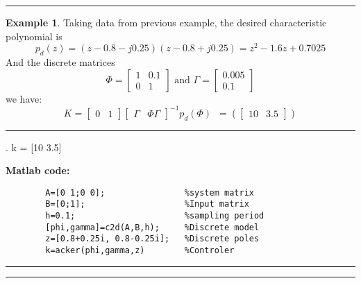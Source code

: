 \documentclass[nols]{tufte-handout}
\theoremstyle{definition}
\newtheorem{exmp}{Example}[section]
\begin{document}
\vspace{1cm}
\hrule height 1pt
\begin{exmp} 
    Taking data from previous example, the desired characteristic polynomial is
\[
p_{d}(z)=(z-0.8-j0.25)(z-0.8+j0.25)=z^{2}-1.6z+0.7025
\]
And the discrete matrices
\[
    \Phi=
    \begin{bmatrix} 
1 & 0.1\\
0 & 1
\end{bmatrix}
\text{ and }
\Gamma=
\begin{bmatrix}
0.005\\
0.1
\end{bmatrix}
\]
we have:
\[
K=
\begin{bmatrix}
0 & 1
\end{bmatrix}
\begin{bmatrix}
\Gamma & \Phi\Gamma
\end{bmatrix}^{-1}p_{d}\left( \Phi \right) \,\,\, = \left(
\begin{bmatrix}
10 & 3.5
\end{bmatrix}
\right)
\]

    \noindent\hfil\rule{\textwidth}{.4pt}\hfil
       \begin{verbbox}[\footnotesize]
                                                            .           
k =
[10  3.5]

    \end{verbbox} 
\textbf{Matlab code:}
    \begin{verbatim}
        A=[0 1;0 0];                %system matrix
        B=[0;1];                    %Input matrix
        h=0.1;                      %sampling period
        [phi,gamma]=c2d(A,B,h);     %Discrete model
        z=[0.8+0.25i, 0.8-0.25i];   %Discrete poles
        k=acker(phi,gamma,z)        %Controler
    \end{verbatim}
    \noindent\hfil\rule{\textwidth}{.4pt}\hfil 

\end{exmp}
\hrule height 1pt
\vspace{1cm}
\end{document}
